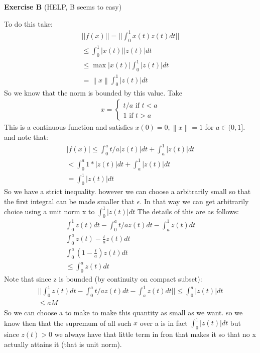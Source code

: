 \documentclass[12pt]{article}
\newcommand{\norm}[1]{\left\lVert#1\right\rVert}
\newenvironment{exercise}[1]{\vspace{.1in}\noindent\textbf{Exercise #1 \hspace{.05em}}}{}
\theoremstyle{definition}
\theoremstyle{remark}
\begin{document}
\begin{exercise}{B} (HELP, B seems to easy)

	To do this take:
	\begin{align}
		||f(x)||=||\int_0^1x(t)z(t)dt||   \\
		\leq \int_0^1|x(t)||z(t)|dt       \\
		\leq \max |x(t)|\int_0^1 |z(t)|dt \\
		=\norm{x}\int_0^1|z(t)|dt
	\end{align}
	So we know that the norm is bounded by this value.  Take
	\begin{align}
		x=%
		\begin{cases}
			t/a \text{ if } t<a \\
			1 \text{ if } t>a
		\end{cases}
	\end{align}
	This is a continuous function and satisfies $x(0)=0,\norm{x}=1$ for $a\in (0,1]$. and note that:
	\begin{align}
		|f(x)|\leq\int_0^at/a|z(t)|dt+\int_a^1|z(t)|dt \\
		< \int_0^a 1*|z(t)|dt+\int_a^1|z(t)|dt         \\
		=\int_0^1|z(t)|dt
	\end{align}
	So we have a strict inequality. however we can choose a arbitrarily small so that the first integral can be made smaller that $\epsilon$. In that way we can get arbitrarily choice using a unit norm x to $\int_0^1|z(t)|dt$ The details of this are as follows:
	\begin{align}
		\int_0^1z(t)dt-\int_0^at/az(t)dt-\int_a^1z(t)dt \\
		\int_0^az(t)- \frac{t}{a}z(t)dt                 \\
		\int_0^a(1- \frac{t}{a})z(t)dt                  \\
		\leq \int_0^a z(t)dt
	\end{align}
	Note that since z is bounded (by continuity on compact subset):
	\begin{align}
		||\int_0^1z(t)dt-\int_0^at/az(t)dt-\int_a^1z(t)dt ||\leq \int_0^a|z(t)|dt \\
		\leq aM
	\end{align}
	So we can choose a to make to make this quantity as small as we want. so we know then that the supremum of all such $x$ over a is in fact $\int_0^1 |z(t)|dt$ but since $z(t)>0$ we always have that little term in fron that makes it so that no x actually attains it (that is unit norm).


\end{exercise}
\end{document}
